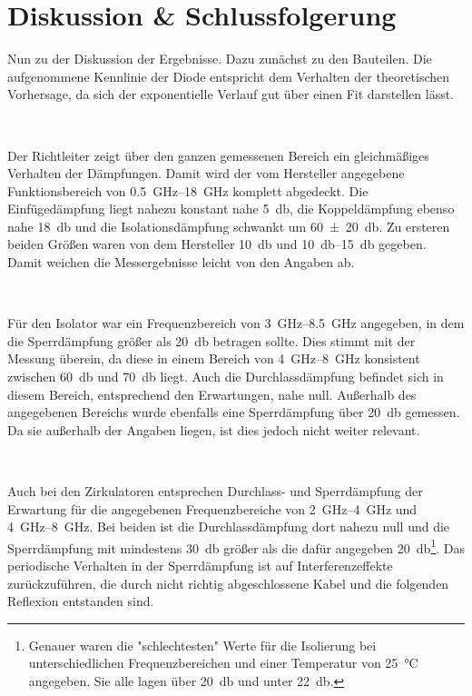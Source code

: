 \section{Diskussion \& Schlussfolgerung}

	Nun zu der Diskussion der Ergebnisse.
	Dazu zunächst zu den Bauteilen.
	Die aufgenommene Kennlinie der Diode entspricht dem Verhalten der theoretischen Vorhersage, da sich der exponentielle Verlauf gut über einen Fit darstellen lässt. 
	
	\
	
	Der Richtleiter zeigt über den ganzen gemessenen Bereich ein gleichmäßiges Verhalten der Dämpfungen.
	Damit wird der vom Hersteller angegebene Funktionsbereich von \SIrange{0,5}{18}{\giga\hertz} komplett abgedeckt.
	Die Einfügedämpfung liegt nahezu konstant nahe \SI{5}{\decibel}, die Koppeldämpfung ebenso nahe \SI{18}{\decibel} und die Isolationsdämpfung schwankt um \SI{60+-20}{\decibel}.
	Zu ersteren beiden Größen waren von dem Hersteller \SI{10}{\decibel} und \SIrange{10}{15}{\decibel} gegeben.
	Damit weichen die Messergebnisse leicht von den Angaben ab.
	
	\
	
	Für den Isolator war ein Frequenzbereich von \SIrange{3}{8,5}{\giga\hertz} angegeben, in dem die Sperrdämpfung größer als \SI{20}{\decibel} betragen sollte.
	Dies stimmt mit der Messung überein, da diese in einem Bereich von \SIrange{4}{8}{\giga\hertz} konsistent zwischen \SI{60}{\decibel} und \SI{70}{\decibel} liegt.
	Auch die Durchlassdämpfung befindet sich in diesem Bereich, entsprechend den Erwartungen, nahe null.
	Außerhalb des angegebenen Bereichs wurde ebenfalls eine Sperrdämpfung über \SI{20}{\decibel} gemessen.
	Da sie außerhalb der Angaben liegen, ist dies jedoch nicht weiter relevant.
	
	\
	
	Auch bei den Zirkulatoren entsprechen Durchlass- und Sperrdämpfung der Erwartung für die angegebenen Frequenzbereiche von \SIrange{2}{4}{\giga\hertz} und \SIrange{4}{8}{\giga\hertz}.
	Bei beiden ist die Durchlassdämpfung dort nahezu null und die Sperrdämpfung mit mindestens \SI{30}{\decibel} größer als die dafür angegeben \SI{20}{\decibel}\footnote{Genauer waren die "schlechtesten" Werte für die Isolierung bei unterschiedlichen Frequenzbereichen und einer Temperatur von \SI{25}{\celsius} angegeben. Sie alle lagen über \SI{20}{\decibel} und unter \SI{22}{\decibel}.}.
	Das periodische Verhalten in der Sperrdämpfung ist auf Interferenzeffekte zurückzuführen, die durch nicht richtig abgeschlossene Kabel und die folgenden Reflexion entstanden sind.
	
